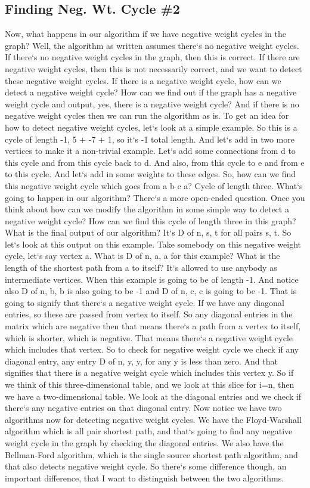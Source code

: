 \subsection{Finding Neg.
Wt.
Cycle \#2}
Now, what happens in our algorithm if we have negative weight cycles in the graph? Well, the algorithm as written assumes there`s no negative weight cycles.
If there`s no negative weight cycles in the graph, then this is correct.
If there are negative weight cycles, then this is not necessarily correct, and we want to detect these negative weight cycles.
If there is a negative weight cycle, how can we detect a negative weight cycle? How can we find out if the graph has a negative weight cycle and output, yes, there is a negative weight cycle? And if there is no negative weight cycles then we can run the algorithm as is.
To get an idea for how to detect negative weight cycles, let`s look at a simple example.
So this is a cycle of length -1, 5 + -7 + 1, so it`s -1 total length.
And let`s add in two more vertices to make it a non-trivial example.
Let`s add some connections from d to this cycle and from this cycle back to d.
And also, from this cycle to e and from e to this cycle.
And let`s add in some weights to these edges.
So, how can we find this negative weight cycle which goes from a b c a? Cycle of length three.
What`s going to happen in our algorithm? There`s a more open-ended question.
Once you think about how can we modify the algorithm in some simple way to detect a negative weight cycle? How can we find this cycle of length three in this graph? What is the final output of our algorithm? It`s D of n, s, t for all pairs s, t.
So let`s look at this output on this example.
Take somebody on this negative weight cycle, let`s say vertex a.
What is D of n, a, a for this example? What is the length of the shortest path from a to itself? It`s allowed to use anybody as intermediate vertices.
When this example is going to be of length -1.
And notice also D of n, b, b is also going to be -1 and D of n, c, c is going to be -1.
That is going to signify that there`s a negative weight cycle.
If we have any diagonal entries, so these are passed from vertex to itself.
So any diagonal entries in the matrix which are negative then that means there`s a path from a vertex to itself, which is shorter, which is negative.
That means there`s a negative weight cycle which includes that vertex.
So to check for negative weight cycle we check if any diagonal entry, any entry D of n, y, y, for any y is less than zero.
And that signifies that there is a negative weight cycle which includes this vertex y.
So if we think of this three-dimensional table, and we look at this slice for i=n, then we have a two-dimensional table.
We look at the diagonal entries and we check if there`s any negative entries on that diagonal entry.
Now notice we have two algorithms now for detecting negative weight cycles.
We have the Floyd-Warshall algorithm which is all pair shortest path, and that`s going to find any negative weight cycle in the graph by checking the diagonal entries.
We also have the Bellman-Ford algorithm, which is the single source shortest path algorithm, and that also detects negative weight cycle.
So there`s some difference though, an important difference, that I want to distinguish between the two algorithms.

